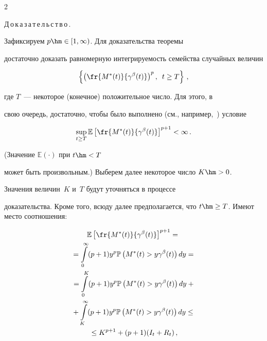 \begin{multicols}{2}
\noindent


Д\,о\,к\,а\,з\,а\,т\,е\,л\,ь\,с\,т\,в\,о\,.\ \ 


Зафиксируем $p \hm\in [1,\infty)$. Для доказательства теоремы


достаточно доказать равномерную интегрируемость семейства случайных величин


$$


\left\{\left(\fr{ M^*(t)}{\gamma^\beta(t)}\right)^p,\enskip t\ge


T\right\}\,,


$$


где $T$~--- некоторое (конечное) положительное чис\-ло. Для этого, в


свою очередь, достаточно, чтобы было выполнено (см., например,~\cite{Billingsley}) условие


\begin{equation}


\label{2.2.l1} 


\sup\limits_{t \geq T} \mathbb{E} \left[


\fr{M^*(t)}{\gamma^\beta(t)} \right]^{p+1} < \infty\,.


\end{equation}


 (Значение $\mathbb{E}(\cdot)$ при $t\hm<T$


может быть произвольным.) Выберем далее некоторое число $K\hm>0$.


Значения величин~$K$ и~$T$ будут уточняться в процессе


доказательства. Кроме того, всюду далее предполагается, что $t\hm\ge


T$. Имеют место  соотношения:


\begin{multline}


\mathbb{E} \left[ \fr{M^*(t)}{\gamma^\beta(t)}\right]^{p+1} = {}\\


{}=


\int\limits_{0}^\infty (p+1)y^p \Pu\left(M^*(t)>y \gamma^\beta(t)\right)dy={}\\


{}= \int\limits_{0}^K (p+1)y^p \Pu\left(M^*(t)>y \gamma^\beta(t)\right)dy+{}\\


{}+\int\limits_{K}^\infty (p+1)y^p \Pu\left(M^*(t)>y \gamma^\beta(t)\right)dy \leq{} \\


{}\leq K^{p+1} + (p+1)(I_t+R_t)\,,\label{2.2.l9}



\end{multline}
\end{multicols}

